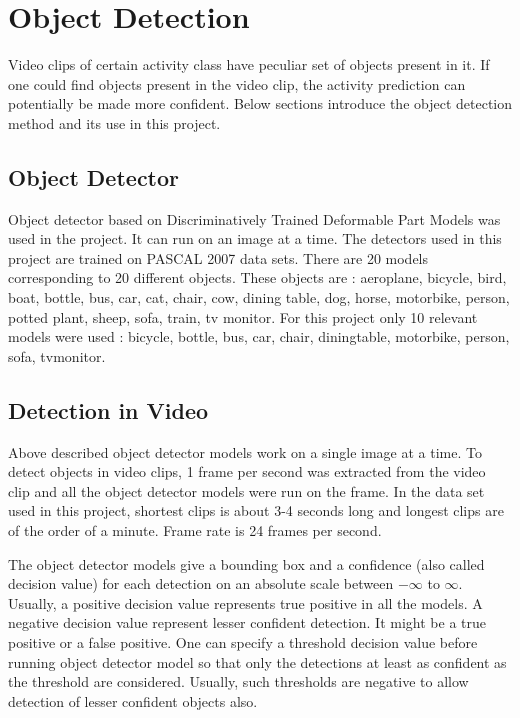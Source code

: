 \chapter{Object Detection}

\label{ch3_OBJ}


Video clips of certain activity class have peculiar set of objects present in it.
If one could find objects present in the video clip, the activity prediction can 
potentially be made more confident. Below sections introduce the object detection
method and its use in this project.

\section{Object Detector}
Object detector based on Discriminatively Trained Deformable Part Models \cite{voc-release4} was used in
the project. It can run on an image at a time. The detectors used in this project are trained on PASCAL 2007 data sets.
There are 20 models corresponding to 20 different objects.
These objects are : aeroplane, bicycle,
bird, boat, bottle, bus, car, cat, chair, cow, dining table, dog, horse,
motorbike, person, potted plant, sheep, sofa, train, tv monitor.
For this project only 10 relevant models were used : bicycle, bottle, bus, car,
chair, diningtable, motorbike, person, sofa, tvmonitor.

\section{Detection in Video}
Above described object detector models work on a single image at a time. To detect objects in video clips, 1 frame per second was extracted from the video clip and all the object detector models were run on the frame. In the data set used in this project, shortest clips is about 3-4 seconds long and longest clips are of the order of a minute. Frame rate is 24 frames per second.

The object detector models give a bounding box and a confidence (also called decision value) for each detection 
on an absolute scale between $-\infty$ to $\infty$. 
Usually, a positive decision value represents true positive in all the models. 
A negative decision value represent lesser confident detection. 
It might be a true positive or a false positive. 
One can specify a threshold decision value before running object detector model 
so that only the detections at least as confident as the threshold are considered.
Usually, such thresholds are negative to allow detection of lesser confident objects also.

